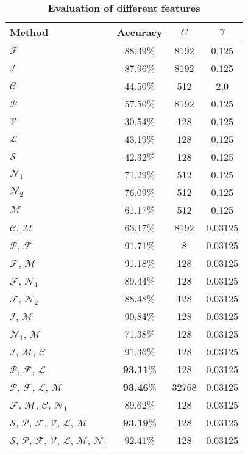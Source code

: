 \documentclass[11pt,english]{article}
\begin{document}
\begin{table*}[htb]
\begin{center}%
\caption{\small \textbf{\textsf{Evaluation of different features}}}%
\begin{tabular}{l c c c}%
\toprule%
Method & Accuracy & $C$ & $\gamma$ \\
\midrule
$\mathcal{F}$ & 88.39\% & 8192 & 0.125\\
$\mathcal{I}$ & 87.96\% & 8192 & 0.125\\
$\mathcal{C}$ & 44.50\% & 512 & 2.0\\
$\mathcal{P}$ & 57.50\% & 8192 & 0.125\\
$\mathcal{V}$ & 30.54\% & 128 & 0.125\\
$\mathcal{L}$ & 43.19\% & 128 & 0.125\\
$\mathcal{S}$ & 42.32\% & 128 & 0.125\\
$\mathcal{N}_1$ & 71.29\% & 512 & 0.125\\
$\mathcal{N}_2$ & 76.09\% & 512 & 0.125\\
$\mathcal{M}$ & 61.17\% & 512 & 0.125\\
$\mathcal{C}$, $\mathcal{M}$ & 63.17\% & 8192 & 0.03125\\
$\mathcal{P}$, $\mathcal{F}$ & 91.71\% & 8 & 0.03125\\
$\mathcal{F}$, $\mathcal{M}$ & 91.18\% & 128 & 0.03125\\
$\mathcal{F}$, $\mathcal{N}_1$ & 89.44\% & 128 & 0.03125\\
$\mathcal{F}$, $\mathcal{N}_2$ & 88.48\% & 128 & 0.03125\\
$\mathcal{I}$, $\mathcal{M}$ & 90.84\% & 128 & 0.03125\\
$\mathcal{N}_1$, $\mathcal{M}$ & 71.38\% & 128 & 0.03125\\
$\mathcal{I}$, $\mathcal{M}$, $\mathcal{C}$ & 91.36\% & 128 & 0.03125\\
$\mathcal{P}$, $\mathcal{F}$, $\mathcal{L}$ & \textbf{93.11}\% & 128 & 0.03125\\
$\mathcal{P}$, $\mathcal{F}$, $\mathcal{L}$, $\mathcal{M}$ & \textbf{93.46}\% & 32768 & 0.03125\\
$\mathcal{F}$, $\mathcal{M}$, $\mathcal{C}$, $\mathcal{N}_1$ & 89.62\% & 128 & 0.03125\\
$\mathcal{S}$, $\mathcal{P}$, $\mathcal{F}$, $\mathcal{V}$, $\mathcal{L}$, $\mathcal{M}$ & \textbf{93.19}\% & 128 & 0.03125\\
$\mathcal{S}$, $\mathcal{P}$, $\mathcal{F}$, $\mathcal{V}$, $\mathcal{L}$, $\mathcal{M}$, $\mathcal{N}_1$ & 92.41\% & 128 & 0.03125\\
\bottomrule%
\end{tabular}%
\label{tbl:eval}%
\end{center}
\end{table*}
\end{document}
